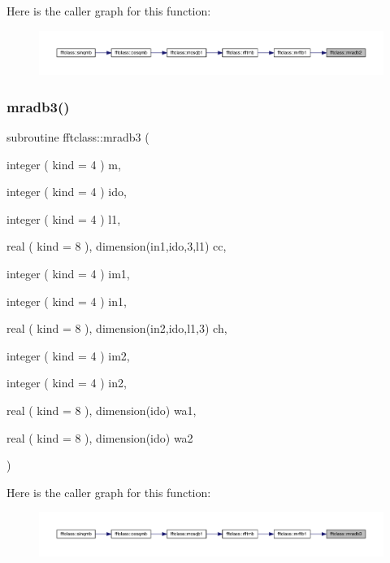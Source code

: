 Here is the caller graph for this function\+:\nopagebreak
\begin{figure}[H]
\begin{center}
\leavevmode
\includegraphics[width=350pt]{namespacefftclass_a39691ebdf781bf380b7ef426f4027896_icgraph}
\end{center}
\end{figure}
\mbox{\label{namespacefftclass_a493cf432cfe190657e9a56a0d452b275}} 
\subsubsection{\texorpdfstring{mradb3()}{mradb3()}}
{\footnotesize\ttfamily subroutine fftclass\+::mradb3 (\begin{DoxyParamCaption}\item[{integer ( kind = 4 )}]{m,  }\item[{integer ( kind = 4 )}]{ido,  }\item[{integer ( kind = 4 )}]{l1,  }\item[{real ( kind = 8 ), dimension(in1,ido,3,l1)}]{cc,  }\item[{integer ( kind = 4 )}]{im1,  }\item[{integer ( kind = 4 )}]{in1,  }\item[{real ( kind = 8 ), dimension(in2,ido,l1,3)}]{ch,  }\item[{integer ( kind = 4 )}]{im2,  }\item[{integer ( kind = 4 )}]{in2,  }\item[{real ( kind = 8 ), dimension(ido)}]{wa1,  }\item[{real ( kind = 8 ), dimension(ido)}]{wa2 }\end{DoxyParamCaption})}

Here is the caller graph for this function\+:\nopagebreak
\begin{figure}[H]
\begin{center}
\leavevmode
\includegraphics[width=350pt]{namespacefftclass_a493cf432cfe190657e9a56a0d452b275_icgraph}
\end{center}
\end{figure}
\mbox{\label{namespacefftclass_a5aae50728c25b5089b6b3c61d3ef27eb}} 
